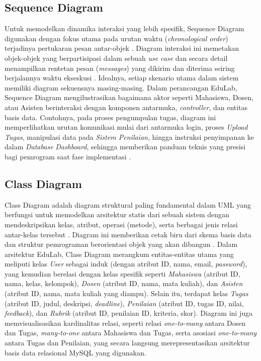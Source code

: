 \documentclass[12pt,a4paper,twoside]{report}
\begin{document}
\subsection{Sequence Diagram}

Untuk memodelkan dinamika interaksi yang lebih spesifik, Sequence Diagram digunakan dengan fokus utama pada urutan waktu (\textit{chronological order}) terjadinya pertukaran pesan antar-objek \cite{fowler2004}. Diagram interaksi ini memetakan objek-objek yang berpartisipasi dalam sebuah \textit{use case} dan secara detail menampilkan rentetan pesan (\textit{messages}) yang dikirim dan diterima seiring berjalannya waktu ekseskusi \cite{dennis2015}. Idealnya, setiap skenario utama dalam sistem memiliki diagram sekuensnya masing-masing. Dalam perancangan EduLab, Sequence Diagram mengilustrasikan bagaimana aktor seperti Mahasiswa, Dosen, atau Asisten berinteraksi dengan komponen antarmuka, \textit{controller}, dan entitas basis data. Contohnya, pada proses pengumpulan tugas, diagram ini memperlihatkan urutan komunikasi mulai dari antarmuka login, proses \textit{Upload Tugas}, manipulasi data pada \textit{Sistem Penilaian}, hingga instruksi penyimpanan ke dalam \textit{Database} \textit{Dashboard}, sehingga memberikan panduan teknis yang presisi bagi pemrogram saat fase implementasi \cite{valdez2018}.

\subsection{Class Diagram}

Class Diagram adalah diagram struktural paling fundamental dalam UML yang berfungsi untuk memodelkan arsitektur statis dari sebuah sistem dengan mendeskripsikan kelas, atribut, operasi (metode), serta berbagai jenis relasi antar-kelas tersebut \cite{booch2005}. Diagram ini memberikan cetak biru dari skema basis data dan struktur pemrograman berorientasi objek yang akan dibangun \cite{dennis2015}. Dalam arsitektur EduLab, Class Diagram merangkum entitas-entitas utama yang meliputi kelas \textit{User} sebagai induk (dengan atribut ID, nama, email, \textit{password}), yang kemudian berelasi dengan kelas spesifik seperti \textit{Mahasiswa} (atribut ID, nama, kelas, kelompok), \textit{Dosen} (atribut ID, nama, mata kuliah), dan \textit{Asisten} (atribut ID, nama, mata kuliah yang diampu). Selain itu, terdapat kelas \textit{Tugas} (atribut ID, judul, deskripsi, \textit{deadline}), \textit{Penilaian} (atribut ID, tugas ID, nilai, \textit{feedback}), dan \textit{Rubrik} (atribut ID, penilaian ID, kriteria, skor). Diagram ini juga memvisualisasikan kardinalitas relasi, seperti relasi \textit{one-to-many} antara Dosen dan Tugas, \textit{many-to-one} antara Mahasiswa dan Tugas, serta asosiasi \textit{one-to-many} antara Tugas dan Penilaian, yang secara langsung merepresentasikan arsitektur basis data relasional MySQL yang digunakan.
\end{document}
